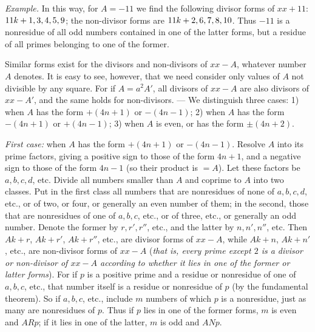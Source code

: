 \textit{Example.} In this way, for $A=-11$ we find the following divisor forms of $xx+11$: $11k+\nobreak{}1,\allowbreak{}3,\allowbreak{}4,\allowbreak{}5,\allowbreak{}9$; the non-divisor forms are $11k+\nobreak{}2,\allowbreak{}6,\allowbreak{}7,\allowbreak{}8,\allowbreak{}10$. Thus $-11$ is a nonresidue of all odd numbers contained in one of the latter forms, but a residue of all primes belonging to one of the former.

Similar forms exist for the divisors and non-divisors of $xx-A$, whatever number $A$ denotes. It is easy to see, however, that we need consider only values of $A$ not divisible by any square. For if $A=a^2A'$, all divisors of $xx-A$ are also divisors of $xx-A'$, and the same holds for non-divisors. --- We distinguish three cases: 1) when $A$ has the form $+(4n+1)$ or $-(4n-1)$; 2) when $A$ has the form $-(4n+1)$ or $+(4n-1)$; 3) when $A$ is even, or has the form $\pm(4n+2)$.

\textit{First case:} when $A$ has the form $+(4n+1)$ or $-(4n-1)$. Resolve $A$ into its prime factors, giving a positive sign to those of the form $4n+1$, and a negative sign to those of the form $4n-1$ (so their product is $=A$). Let these factors be $a,b,c,d$, etc. Divide all numbers smaller than $A$ and coprime to $A$ into two classes. Put in the first class all numbers that are nonresidues of none of $a,b,c,d$, etc., or of two, or four, or generally an even number of them; in the second, those that are nonresidues of one of $a,b,c$, etc., or of three, etc., or generally an odd number. Denote the former by $r,r',r''$, etc., and the latter by $n,n',n''$, etc. Then $Ak+r$, $Ak+r'$, $Ak+r''$, etc., are divisor forms of $xx-A$, while $Ak+n$, $Ak+n'$, etc., are non-divisor forms of $xx-A$ (\textit{that is, every prime except $2$ is a divisor or non-divisor of $xx-A$ according to whether it lies in one of the former or latter forms}). For if $p$ is a positive prime and a residue or nonresidue of one of $a,b,c$, etc., that number itself is a residue or nonresidue of $p$ (by the fundamental theorem). So if $a,b,c$, etc., include $m$ numbers of which $p$ is a nonresidue, just as many are nonresidues of $p$. Thus if $p$ lies in one of the former forms, $m$ is even and $ARp$; if it lies in one of the latter, $m$ is odd and $ANp$.

